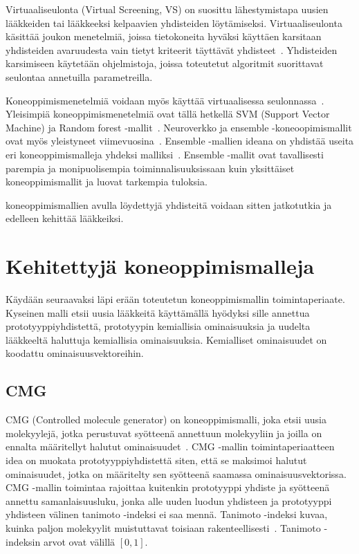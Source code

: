\documentclass[finnish,twoside,censored,tkt,sw-line]{HYthesisML}
\begin{document}
Virtuaaliseulonta (Virtual Screening, VS) on suosittu lähestymistapa uusien lääkkeiden tai lääkkeeksi kelpaavien yhdisteiden löytämiseksi.
Virtuaaliseulonta käsittää joukon menetelmiä, joissa tietokoneita hyväksi käyttäen karsitaan yhdisteiden avaruudesta vain tietyt kriteerit täyttävät yhdisteet~\cite{SotrifferChristoph2011VSPC}.
Yhdisteiden karsimiseen käytetään ohjelmistoja, joissa toteutetut algoritmit suorittavat seulontaa annetuilla parametreilla.

Koneoppimismenetelmiä voidaan myös käyttää virtuaalisessa seulonnassa~\cite{SotrifferChristoph2011VSPC}.
Yleisimpiä koneoppimismenetelmiä ovat tällä hetkellä SVM (Support Vector Machine) ja Random forest -mallit~\cite{SotrifferChristoph2011VSPC}.
Neuroverkko ja ensemble -koneoopimismallit ovat myös yleistyneet viimevuosina~\cite{ShinBonggun,PopovaMariya2018Drlf}.
Ensemble -mallien ideana on yhdistää useita eri koneoppimismalleja yhdeksi malliksi~\cite{RokachLior2009Ec}.
Ensemble -mallit ovat tavallisesti parempia ja monipuolisempia toiminnalisuuksissaan kuin yksittäiset koneoppimismallit ja luovat tarkempia tuloksia.

koneoppimismallien avulla löydettyjä yhdisteitä voidaan sitten jatkotutkia ja edelleen kehittää lääkkeiksi.

\section{Kehitettyjä koneoppimismalleja}
Käydään seuraavaksi läpi erään toteutetun koneoppimismallin toimintaperiaate.
Kyseinen malli etsii uusia lääkkeitä käyttämällä hyödyksi sille annettua prototyyppiyhdistettä, prototyypin kemiallisia ominaisuuksia ja uudelta lääkkeeltä haluttuja kemiallisia ominaisuuksia.
Kemialliset ominaisuudet on koodattu ominaisuusvektoreihin.

\subsection{CMG}

CMG (Controlled molecule generator) on koneoppimismalli, joka etsii uusia molekyylejä, jotka perustuvat syötteenä annettuun molekyyliin ja joilla on ennalta määritellyt halutut ominaisuudet~\cite{ShinBonggun}.
CMG -mallin toimintaperiaatteen idea on muokata prototyyppiyhdistettä siten, että se maksimoi halutut ominaisuudet, jotka on määritelty sen syötteenä saamassa ominaisuusvektorissa.
CMG -mallin toimintaa rajoittaa kuitenkin prototyyppi yhdiste ja syötteenä annettu samanlaisuusluku, jonka alle uuden luodun yhdisteen ja prototyyppi yhdisteen välinen tanimoto -indeksi ei saa mennä.
Tanimoto -indeksi kuvaa, kuinka paljon molekyylit muistuttavat toisiaan rakenteellisesti~\cite{MaggioraGerald2014Msim}.
Tanimoto -indeksin arvot ovat välillä \([0,1]\).
\end{document}
